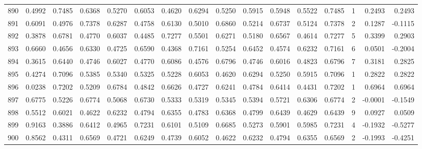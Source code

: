 \begin{tabular}{lrrrrrrrrrrrrrrr}
890 &      0.4992 &  0.7485 &  0.6368 &  0.5270 &  0.6053 &  0.4620 &  0.6294 &  0.5250 &  0.5915 &  0.5948 &   0.5522 &     0.7485 &      1 &                    0.2493 &                     0.2493 \\
891 &      0.6091 &  0.4976 &  0.7378 &  0.6287 &  0.4758 &  0.6130 &  0.5010 &  0.6860 &  0.5214 &  0.6737 &   0.5124 &     0.7378 &      2 &                    0.1287 &                    -0.1115 \\
892 &      0.3878 &  0.6781 &  0.4770 &  0.6037 &  0.4485 &  0.7277 &  0.5501 &  0.6271 &  0.5180 &  0.6567 &   0.4614 &     0.7277 &      5 &                    0.3399 &                     0.2903 \\
893 &      0.6660 &  0.4656 &  0.6330 &  0.4725 &  0.6590 &  0.4368 &  0.7161 &  0.5254 &  0.6452 &  0.4574 &   0.6232 &     0.7161 &      6 &                    0.0501 &                    -0.2004 \\
894 &      0.3615 &  0.6440 &  0.4746 &  0.6027 &  0.4770 &  0.6086 &  0.4576 &  0.6796 &  0.4746 &  0.6016 &   0.4823 &     0.6796 &      7 &                    0.3181 &                     0.2825 \\
895 &      0.4274 &  0.7096 &  0.5385 &  0.5340 &  0.5325 &  0.5228 &  0.6053 &  0.4620 &  0.6294 &  0.5250 &   0.5915 &     0.7096 &      1 &                    0.2822 &                     0.2822 \\
896 &      0.0238 &  0.7202 &  0.5209 &  0.6784 &  0.4842 &  0.6626 &  0.4727 &  0.6241 &  0.4784 &  0.6414 &   0.4431 &     0.7202 &      1 &                    0.6964 &                     0.6964 \\
897 &      0.6775 &  0.5226 &  0.6774 &  0.5068 &  0.6730 &  0.5333 &  0.5319 &  0.5345 &  0.5394 &  0.5721 &   0.6306 &     0.6774 &      2 &                   -0.0001 &                    -0.1549 \\
898 &      0.5512 &  0.6021 &  0.4622 &  0.6232 &  0.4794 &  0.6355 &  0.4783 &  0.6368 &  0.4799 &  0.6439 &   0.4629 &     0.6439 &      9 &                    0.0927 &                     0.0509 \\
899 &      0.9163 &  0.3886 &  0.6412 &  0.4965 &  0.7231 &  0.6101 &  0.5109 &  0.6685 &  0.5273 &  0.5901 &   0.5985 &     0.7231 &      4 &                   -0.1932 &                    -0.5277 \\
900 &      0.8562 &  0.4311 &  0.6569 &  0.4721 &  0.6249 &  0.4739 &  0.6052 &  0.4622 &  0.6232 &  0.4794 &   0.6355 &     0.6569 &      2 &                   -0.1993 &                    -0.4251 \\

\end{tabular}
